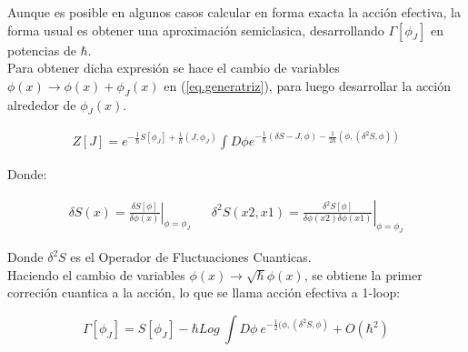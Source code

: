 \begin{comment}
Para demostrar esto se toma su derivada funcional evaluada en el campo medio $\phi _J $.


\begin{equation}
\frac{\delta \Gamma [ \phi _J ]}{\delta \phi _J (x) } = 
J(x) + \int dx ' \frac{\delta J [\phi _J ]}{\delta \phi _J (x) } \phi _J (x) - 
\frac{1}{Z[J]} \int dx' \frac{\delta Z[J] }{\delta J(x')} \frac{\delta J[\phi _J ]}{\delta \phi _J (x)} = J(x) \\[8pt]
\end{equation}
\end{comment}

Aunque es posible en algunos casos calcular en forma exacta la acción efectiva, la forma usual es obtener una aproximación semiclasica, desarrollando $\Gamma [ \phi _J]$ en potencias de $\hbar$. \\


Para obtener dicha expresión se hace el cambio de variables $\phi (x) \rightarrow \phi(x) + \phi _J (x) $ en (\ref{eq.generatriz}), para luego desarrollar la acción alrededor de $\phi _J (x)$.


\begin{equation}
\begin{array}{c}
Z[J] = e ^{- \frac{1}{\hbar} S[ \phi _J ] + \frac{1}{\hbar} (J, \phi _J )} 
\int D \phi e ^{ - \frac{1}{\hbar} (\delta S  - J, \phi ) - \frac{1}{2 \hbar}  (\phi, (\delta ^2 S, \phi ) ) }
\end{array}
\end{equation}

Donde:

\begin{equation}
\begin{array}{ccc}
\delta S(x) = \left. \frac{\delta S[\phi]}{ \delta \phi (x) } \right| _{\phi = \phi _J} & &
\delta ^2 S(x2,x1) = \left. \frac{\delta ^2 S[\phi]}{ \delta \phi (x2) \delta \phi (x1) } \right| _{\phi = \phi _J}
\end{array}
\end{equation}


Donde $ \delta ^2 S $ es el Operador de Fluctuaciones Cuanticas. \\


Haciendo el cambio de variables $\phi (x) \rightarrow \sqrt{\hbar} \phi (x) $, se obtiene la primer correción cuantica a la  acción, lo que se llama acción efectiva a 1-loop:


\begin{equation}
\Gamma [\phi _J ] = S [ \phi _J ] - 
\hbar Log \ 
\int D \phi \ e ^{- \frac{1}{2}  (\phi, (\delta ^2 S, \phi) } + O(\hbar ^2)
\end{equation}


